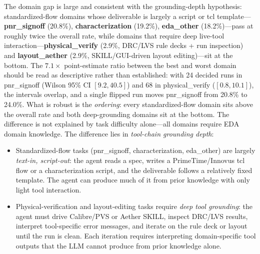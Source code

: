 The domain gap is large and consistent with the grounding-depth hypothesis: standardized-flow domains whose deliverable is largely a script or tcl template---\textbf{pnr\_signoff} (20.8\%), \textbf{characterization} (19.2\%), \textbf{eda\_other} (18.2\%)---pass at roughly twice the overall rate, while domains that require deep live-tool interaction---\textbf{physical\_verify} (2.9\%, DRC/LVS rule decks + run inspection) and \textbf{layout\_aether} (2.9\%, SKILL/GUI-driven layout editing)---sit at the bottom. The $7.1\times$ point-estimate ratio between the best and worst domain should be read as descriptive rather than established: with 24 decided runs in pnr\_signoff (Wilson 95\% CI $[9.2,40.5]$) and 68 in physical\_verify ($[0.8,10.1]$), the intervals overlap, and a single flipped run moves pnr\_signoff from 20.8\% to 24.0\%. What is robust is the \emph{ordering}: every standardized-flow domain sits above the overall rate and both deep-grounding domains sit at the bottom. The difference is not explained by task difficulty alone---all domains require EDA domain knowledge. The difference lies in \emph{tool-chain grounding depth}:

\begin{itemize}
    \item Standardized-flow tasks (pnr\_signoff, characterization, eda\_other) are largely \emph{text-in, script-out}: the agent reads a spec, writes a PrimeTime/Innovus tcl flow or a characterization script, and the deliverable follows a relatively fixed template. The agent can produce much of it from prior knowledge with only light tool interaction.
    \item Physical-verification and layout-editing tasks require \emph{deep tool grounding}: the agent must drive Calibre/PVS or Aether SKILL, inspect DRC/LVS results, interpret tool-specific error messages, and iterate on the rule deck or layout until the run is clean. Each iteration requires interpreting domain-specific tool outputs that the LLM cannot produce from prior knowledge alone.
\end{itemize}

